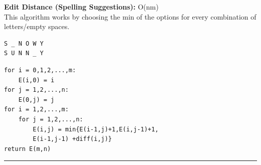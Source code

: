 \documentclass[10pt,landscape]{article}
\begin{document}
\begin{multicols}{3}
{\scriptsize {\bf Edit Distance (Spelling Suggestions):} O(nm)\\
This algorithm works by choosing the min of the options for every combination of letters/empty spaces.\vspace{-10pt}
\begin{verbatim}
S _ N O W Y
S U N N _ Y
\end{verbatim}\vspace{-20pt}
\begin{verbatim}
for i = 0,1,2,...,m:
    E(i,0) = i
for j = 1,2,...,n:
    E(0,j) = j
for i = 1,2,...,m:
    for j = 1,2,...,n:
        E(i,j) = min{E(i-1,j)+1,E(i,j-1)+1,
        E(i-1,j-1) +diff(i,j)}
return E(m,n)
\end{verbatim}}





\rule{0.3\linewidth}{0.25pt}
\scriptsize


\end{multicols}
\end{document}
